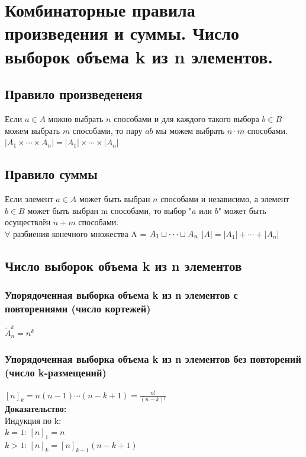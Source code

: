 \documentclass[12pt]{article}
\begin{document}

\section{Комбинаторные правила произведения и суммы. Число выборок объема k из n элементов. }

\subsection{Правило произведенеия}
	Если $a \in A$ можно выбрать $n$ способами и для каждого такого выбора
	$b \in B$ можем выбрать $m$ способами, то пару $ab$ мы можем выбрать $n\cdot m$ способами.\\
	$| A_1 \times \dotsb \times A_n| = |A_1| \times \dotsb \times |A_n|$

\subsection{Правило суммы}
	Если элемент $a \in A$ может быть выбран $n$ способами и независимо, а элемент $b \in B$ может быть выбран m способами, то выбор "$a$ или $b$" может быть осуществлён $n + m$ способами.\\
	$\forall$ разбиения конечного множества A = $A_1 \sqcup \dotsb \sqcup A_n \newline$ 
	$|A| = |A_1| + \dotsb + |A_n|$

\subsection{Число выборок объема k из n элементов}
\subsubsection{Упорядоченная выборка объема k из n элементов с повторениями (число кортежей)}
	$\widetilde{A}_n^k = n^k$

\subsubsection{Упорядоченная выборка объема k из n элементов без повторений (число k-размещений)}
	$[n]_k = n(n - 1)\dotsb(n - k + 1) = \frac{n!}{(n-k)!}$\\
	\textbf{Доказательство:}\\
	Индукция по k:\\
	$k = 1$: $[n]_1 = n$\\
	$k > 1$: $[n]_k = [n]_{k-1}(n-k+1)$\\
	\qedsymbol
\end{document}

